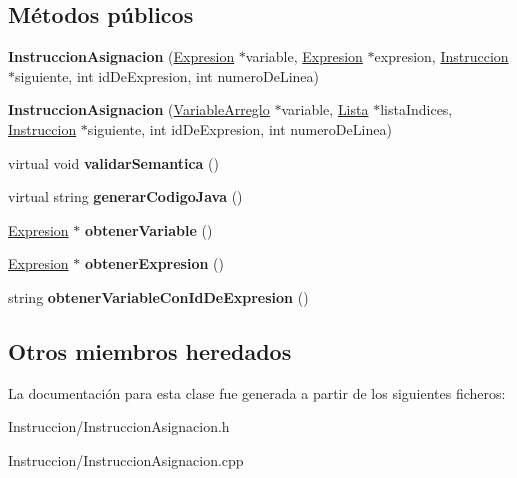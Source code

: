 \subsection*{Métodos públicos}
\begin{DoxyCompactItemize}
\item 
\hypertarget{class_instruccion_asignacion_a90f0375cdae6fa64adbd0c2aceb84414}{{\bfseries Instruccion\-Asignacion} (\hyperlink{class_expresion}{Expresion} $\ast$variable, \hyperlink{class_expresion}{Expresion} $\ast$expresion, \hyperlink{class_instruccion}{Instruccion} $\ast$siguiente, int id\-De\-Expresion, int numero\-De\-Linea)}\label{class_instruccion_asignacion_a90f0375cdae6fa64adbd0c2aceb84414}

\item 
\hypertarget{class_instruccion_asignacion_a998f9625b02d658d2bfc40de0f566fa9}{{\bfseries Instruccion\-Asignacion} (\hyperlink{class_variable_arreglo}{Variable\-Arreglo} $\ast$variable, \hyperlink{class_lista}{Lista} $\ast$lista\-Indices, \hyperlink{class_instruccion}{Instruccion} $\ast$siguiente, int id\-De\-Expresion, int numero\-De\-Linea)}\label{class_instruccion_asignacion_a998f9625b02d658d2bfc40de0f566fa9}

\item 
\hypertarget{class_instruccion_asignacion_a4d7d5963281b5f88540c17a2943fb42c}{virtual void {\bfseries validar\-Semantica} ()}\label{class_instruccion_asignacion_a4d7d5963281b5f88540c17a2943fb42c}

\item 
\hypertarget{class_instruccion_asignacion_a9adc3f513455df4e091e45beeaad373d}{virtual string {\bfseries generar\-Codigo\-Java} ()}\label{class_instruccion_asignacion_a9adc3f513455df4e091e45beeaad373d}

\item 
\hypertarget{class_instruccion_asignacion_a6ff32eb066888eac75245868ea8479f1}{\hyperlink{class_expresion}{Expresion} $\ast$ {\bfseries obtener\-Variable} ()}\label{class_instruccion_asignacion_a6ff32eb066888eac75245868ea8479f1}

\item 
\hypertarget{class_instruccion_asignacion_aa45f3254717e9723f00cae33c7bc295c}{\hyperlink{class_expresion}{Expresion} $\ast$ {\bfseries obtener\-Expresion} ()}\label{class_instruccion_asignacion_aa45f3254717e9723f00cae33c7bc295c}

\item 
\hypertarget{class_instruccion_asignacion_af2c792b744d63e163e249d8d4472f373}{string {\bfseries obtener\-Variable\-Con\-Id\-De\-Expresion} ()}\label{class_instruccion_asignacion_af2c792b744d63e163e249d8d4472f373}

\end{DoxyCompactItemize}
\subsection*{Otros miembros heredados}


La documentación para esta clase fue generada a partir de los siguientes ficheros\-:\begin{DoxyCompactItemize}
\item 
Instruccion/Instruccion\-Asignacion.\-h\item 
Instruccion/Instruccion\-Asignacion.\-cpp\end{DoxyCompactItemize}
